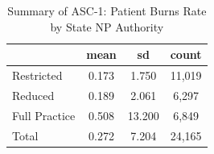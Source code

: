 \begin{table}[htbp]\centering
\def\sym#1{\ifmmode^{#1}\else\(^{#1}\)\fi}
\caption{Summary of ASC-1: Patient Burns Rate by State NP Authority}
\begin{tabular}{l*{1}{ccc}}
\toprule
                    &        mean&          sd&       count\\
\midrule
Restricted          &       0.173&       1.750&      11,019\\
Reduced             &       0.189&       2.061&       6,297\\
Full Practice       &       0.508&      13.200&       6,849\\
Total               &       0.272&       7.204&      24,165\\
\bottomrule
\end{tabular}
\end{table}
